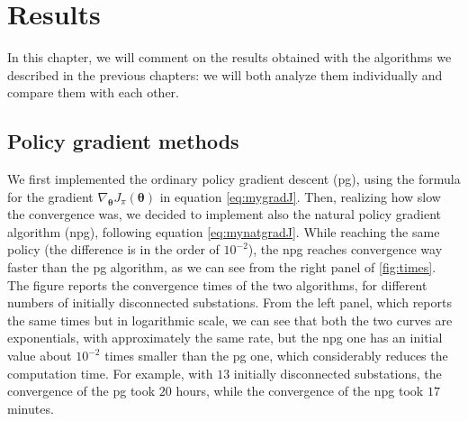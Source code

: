 \chapter{Results}



In this chapter, we will comment on the results obtained with the algorithms we described in the previous chapters: we will both analyze them individually and compare them with each other.

\section{Policy gradient methods}

We first implemented the ordinary policy gradient descent (\acrshort{pg}), using the formula for the gradient $\nabla_{\boldsymbol \theta} J_\pi (\boldsymbol \theta)$ in equation \eqref{eq:mygradJ}. Then, realizing how slow the convergence was, we decided to implement also the natural policy gradient algorithm (\acrshort{npg}), following equation \eqref{eq:mynatgradJ}. While reaching the same policy (the difference is in the order of $10^{-2}$), the \acrshort{npg} reaches convergence way faster than the \acrshort{pg} algorithm, as we can see from the right panel of \autoref{fig:times}. The figure reports the convergence times of the two algorithms, for different numbers of initially disconnected substations. From the left panel, which reports the same times but in logarithmic scale, we can see that both the two curves are exponentials, with approximately the same rate, but the \acrshort{npg} one has an initial value about $10^{-2}$ times smaller than the \acrshort{pg} one, which considerably reduces the computation time. For example, with $13$ initially disconnected substations, the convergence of the \acrshort{pg} took $20$ hours, while the convergence of the \acrshort{npg} took $17$ minutes.

